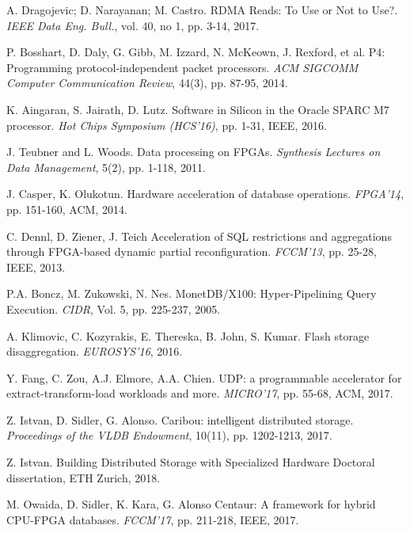 \documentclass[11pt]{article}
\begin{document}
\begin{thebibliography}{10}
 A. Dragojevic; D. Narayanan; M. Castro. \newblock RDMA Reads: To Use or Not to Use?. \newblock \emph{IEEE Data Eng. Bull.}, vol. 40, no 1, pp. 3-14, 2017.

 P. Bosshart, D. Daly, G. Gibb, M. Izzard, N. McKeown, J. Rexford, et al. \newblock P4: Programming protocol-independent packet processors. \newblock \emph{ACM SIGCOMM Computer Communication Review}, 44(3), pp. 87-95, 2014.

 K. Aingaran, S. Jairath, D. Lutz. \newblock Software in Silicon in the Oracle SPARC M7 processor. \newblock \emph{Hot Chips Symposium (HCS'16)}, pp. 1-31, IEEE, 2016.

 J. Teubner and L. Woods. \newblock Data processing on FPGAs. \newblock \emph{Synthesis Lectures on Data Management}, 5(2), pp. 1-118, 2011.

 J. Casper, K. Olukotun. \newblock Hardware acceleration of database operations. \newblock \emph{FPGA'14}, pp. 151-160, ACM, 2014.

 C. Dennl, D. Ziener, J. Teich \newblock Acceleration of SQL restrictions and aggregations through FPGA-based dynamic partial reconfiguration. \newblock \emph{FCCM'13}, pp. 25-28, IEEE, 2013.

 P.A. Boncz, M. Zukowski, N. Nes. \newblock MonetDB/X100: Hyper-Pipelining Query Execution. \newblock \emph{CIDR}, Vol. 5, pp. 225-237, 2005.

 A. Klimovic, C. Kozyrakis, E. Thereska, B. John, S. Kumar. \newblock Flash storage disaggregation. \newblock \emph{EUROSYS'16}, 2016.

 Y. Fang, C. Zou, A.J. Elmore, A.A. Chien. \newblock UDP: a programmable accelerator for extract-transform-load workloads and more. \newblock \emph{MICRO'17}, pp. 55-68, ACM, 2017.

 Z. Istvan, D. Sidler, G. Alonso. \newblock Caribou: intelligent distributed storage. \newblock \emph{Proceedings of the VLDB Endowment}, 10(11), pp. 1202-1213, 2017.

 Z. Istvan. \newblock Building Distributed Storage with Specialized Hardware \newblock Doctoral dissertation, ETH Zurich, 2018.

 M. Owaida, D. Sidler, K. Kara, G. Alonso \newblock Centaur: A framework for hybrid CPU-FPGA databases. \newblock \emph{FCCM'17}, pp. 211-218, IEEE, 2017.


\end{thebibliography}
\end{document}
